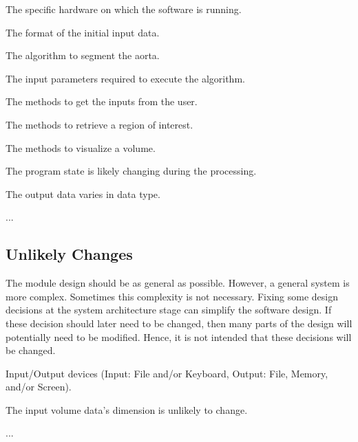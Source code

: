 \documentclass[12pt, titlepage]{article}
\newcounter{acnum}
\newcommand{\actheacnum}{AC\theacnum}
\newcounter{ucnum}
\newcommand{\uctheucnum}{UC\theucnum}
\begin{document}
\begin{description}
\item[ \actheacnum \label{acHardware}:] The specific hardware on which the software is running.
\item[ \actheacnum \label{acInput}:] The format of the initial input data.
\item[ \actheacnum \label{acAlgo}:] The algorithm to segment the aorta.
\item[ \actheacnum \label{acInputParams}:] The input parameters required to execute the algorithm.
\item[ \actheacnum \label{acGetInput}:] The methods to get the inputs from the user.
\item[ \actheacnum \label{acGetROI}:] The methods to retrieve a region of interest.
\item[ \actheacnum \label{acVisualize}:] The methods to visualize a volume.
\item[ \actheacnum \label{acControl}:] The program state is likely changing during the processing.
\item[ \actheacnum \label{acOutput}:] The output data varies in data type.

\item ...
\end{description}

\subsection{Unlikely Changes} \label{SecUchange}

The module design should be as general as possible. However, a general system is
more complex. Sometimes this complexity is not necessary. Fixing some design
decisions at the system architecture stage can simplify the software design. If
these decision should later need to be changed, then many parts of the design
will potentially need to be modified. Hence, it is not intended that these
decisions will be changed.

\begin{description}
\item[ \uctheucnum \label{ucIO}:] Input/Output devices
  (Input: File and/or Keyboard, Output: File, Memory, and/or Screen).
\item[ \uctheucnum \label{ucVolDim}:] The input volume data's dimension is unlikely to change.
\item ...
\end{description}
\end{document}
